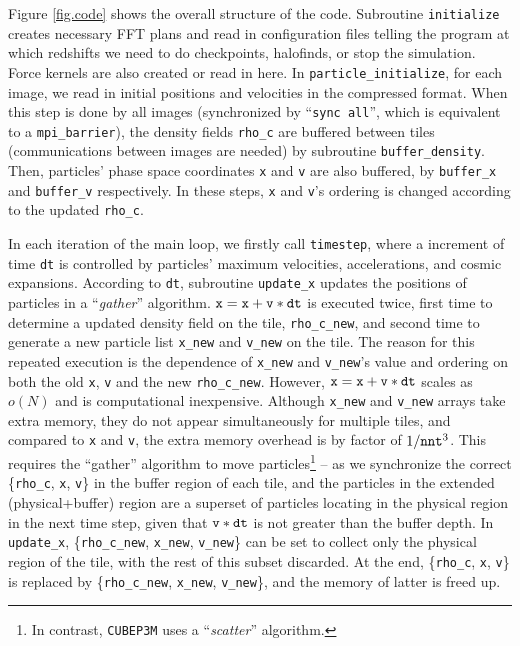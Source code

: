 \documentclass[10pt,twocolumn,preprint]{emulateapj}
\begin{document}
Figure \ref{fig.code} shows the overall structure of the code. Subroutine {\tt initialize} creates necessary FFT plans and read in configuration files telling the program at which redshifts we need to do checkpoints, halofinds, or stop the simulation. Force kernels are also created or read in here. In {\tt particle\_initialize}, for each image, we read in initial positions and velocities in the compressed format. When this step is done by all images (synchronized by ``{\tt sync all}'', which is equivalent to a {\tt mpi\_barrier}), the density fields {\tt rho\_c} are buffered between tiles (communications between images are needed) by subroutine {\tt buffer\_density}. Then, particles' phase space coordinates {\tt x} and {\tt v} are also buffered, by {\tt buffer\_x} and {\tt buffer\_v} respectively. In these steps, {\tt x} and {\tt v}'s ordering is changed according to the updated {\tt rho\_c}.

In each iteration of the main loop, we firstly call {\tt timestep}, where a increment of time {\tt dt} is controlled by particles' maximum velocities, accelerations, and cosmic expansions. According to {\tt dt}, subroutine {\tt update\_x} updates the positions of particles in a ``{\it gather}'' algorithm. ${\tt x}={\tt x}+{\tt v}*{\tt dt}$ is executed twice, first time to determine a updated density field on the tile, {\tt rho\_c\_new}, and second time to generate a new particle list {\tt x\_new} and {\tt v\_new} on the tile. The reason for this repeated execution is the dependence of {\tt x\_new} and {\tt v\_new}'s value and ordering on both the old {\tt x}, {\tt v} and the new {\tt rho\_c\_new}. However, ${\tt x}={\tt x}+{\tt v}*{\tt dt}$ scales as $o(N)$ and is computational inexpensive. Although {\tt x\_new} and {\tt v\_new} arrays take extra memory, they do not appear simultaneously for multiple tiles, and compared to {\tt x} and {\tt v}, the extra memory overhead is by factor of $1/{\tt nnt}^3$. This requires the ``gather'' algorithm to move particles\footnote{In contrast, {\tt CUBEP3M} uses a ``{\it scatter}'' algorithm.} -- as we synchronize the correct \{{\tt rho\_c}, {\tt x}, {\tt v}\} in the buffer region of each tile, and the particles in the extended (physical+buffer) region are a superset of particles locating in the physical region in the next time step, given that ${\tt v}*{\tt dt}$ is not greater than the buffer depth. In {\tt update\_x}, \{{\tt rho\_c\_new}, {\tt x\_new}, {\tt v\_new}\} can be set to collect only the physical region of the tile, with the rest of this subset discarded. At the end, \{{\tt rho\_c}, {\tt x}, {\tt v}\} is replaced by \{{\tt rho\_c\_new}, {\tt x\_new}, {\tt v\_new}\}, and the memory of latter is freed up.
\end{document}
